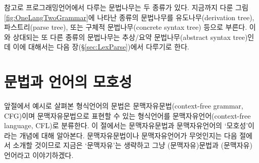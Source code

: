 참고로 프로그래밍언어에서 다루는 문법나무는 두 종류가 있다.
지금까지 다룬 그림\;\ref{fig:OneLangTwoGrammar}에 나타난 종류의 문법나무를
유도나무(derivation tree), 파스트리(parse tree), 또는
구체적 문법나무(concrete syntax tree) 등으로 부른다.
이와 상대되는 또 다른 종류의 문법나무는
추상/요약 문법나무(abstract syntax tree)인데
이에 대해서는 다음 장(\S\ref{sec:LexParse})에서 다루기로 한다.

\section{문법과 언어의 모호성}
\label{sec:ambiguous}
앞절에서 예시로 살펴본 형식언어의 문법은 문맥자유문법(context-free grammar, CFG)이며
문맥자유문법으로 표현할 수 있는 형식언어를 문맥자유언어(context-free language, CFL)로
분류한다. 이 절에서는 문맥자유문법과 문맥자유언어의 `모호성'이라는 개념에 대해 알아본다.
문맥자유문법이나 문맥자유언어가 무엇인지는 다음 절에서 소개할 것이므로
지금은 `문맥자유'는 생략하고 그냥 (문맥자유)문법과 (문맥자유)언어라고 이야기하겠다.

